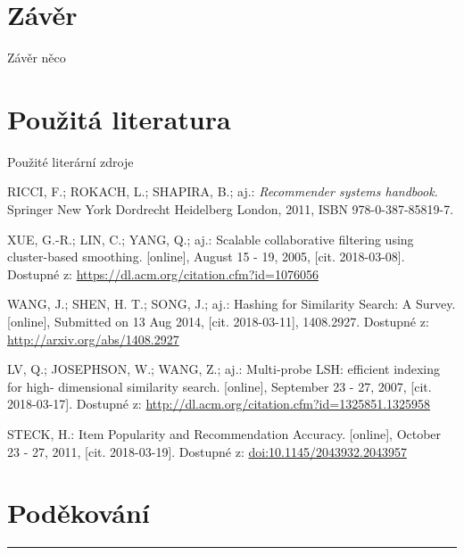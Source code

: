 \documentclass[aspectratio=169,28pt]{beamer}
\begin{document}
\section{Závěr}

\begin{frame}{Závěr}
		něco\cite{handbook}
\end{frame}

\section{Použitá literatura}

\begin{frame}{Použité literární zdroje}
		\begin{thebibliography}{9}
\small

  \color{black}RICCI, F.; ROKACH, L.; SHAPIRA, B.; aj.: \textit{Recommender systems handbook.} Springer New York Dordrecht Heidelberg London, 2011, ISBN 978-0-387-85819-7.
  
  \color{black}XUE, G.-R.; LIN, C.; YANG, Q.; aj.: Scalable collaborative filtering using cluster-based smoothing. [online], August 15 - 19, 2005, [cit. 2018-03-08]. Dostupné z: \url{https://dl.acm.org/citation.cfm?id=1076056}
  
  \color{black}WANG, J.; SHEN, H. T.; SONG, J.; aj.: Hashing for Similarity Search: A Survey. [online], Submitted on 13 Aug 2014, [cit. 2018-03-11], 1408.2927. Dostupné z: \url{http://arxiv.org/abs/1408.2927}
  
  \color{black}LV, Q.; JOSEPHSON, W.; WANG, Z.; aj.: Multi-probe LSH: efficient indexing for high-
dimensional similarity search. [online], September 23 - 27, 2007, [cit. 2018-03-17]. Dostupné z: \url{http://dl.acm.org/citation.cfm?id=1325851.1325958}

  \color{black}STECK, H.: Item Popularity and Recommendation Accuracy. [online], October 23 - 27, 2011, [cit. 2018-03-19]. Dostupné z: \url{doi:10.1145/2043932.2043957}

\end{thebibliography}
		
\end{frame}

\section{Poděkování}

\begin{frame}
		\Huge{}
		\vskip 15pt
		{\color{blue}\rule[2pt]{0.8\textwidth}{2pt}}
		\color{black}\vskip 15pt
		\LARGE{}
\end{frame}
\end{document}
